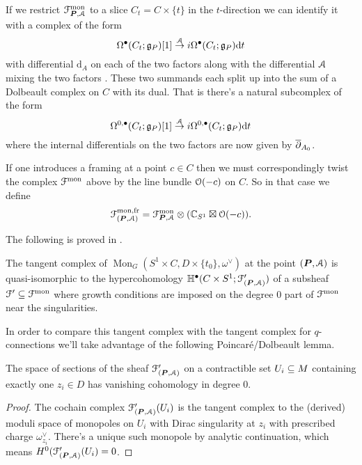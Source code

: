 \documentclass[10pt, oneside]{article}
\DeclareMathOperator{\mon}{Mon}
\renewcommand{\d}{\mathrm{d}}
\begin{document}
\begin{remark} \label{monopole_holo_restriction_rmk}
If we restrict $\mathcal{F}^{\mathrm{mon}}_{\boldsymbol{P}, \mathcal{A}}$ to a slice $C_t = C \times \{t\}$ in the $t$-direction we can identify it with a complex of the form
\[\Omega^\bullet(C_t; \gg_P)[1] \overset {\mc A} \to i \Omega^\bullet(C_t; \gg_P) \d t\]
with differential $\d_A$ on each of the two factors along with the differential $\mathcal{A}$ mixing the two factors .  These two summands each split up into the sum of a Dolbeault complex on $C$ with its dual.  That is there's a natural subcomplex of the form
\[\Omega^{0,\bullet}(C_t; \gg_P)[1] \overset {\mc A} \to i \Omega^{0,\bullet}(C_t; \gg_P) \d t\]
where the internal differentials on the two factors are now given by $\overline{\partial}_{A_0}$.
\end{remark}

\begin{remark}
If one introduces a framing at a point $c \in C$ then we must correspondingly twist the complex $\mathcal{F}^{\mathrm{mon}}$ above by the line bundle $\mathcal{O}(-c)$ on $C$.  So in that case we define 
\[\mathcal{F}^{\text{mon,fr}}_{(\boldsymbol{P},\mathcal{A})} = \mathcal{F}^{\mathrm{mon}}_{\boldsymbol{P}, \mathcal{A}} \otimes (\mathbb{C}_{S^1} \boxtimes \mathcal{O}(-c)).\]
\end{remark}

The following is proved in \cite{FoscoloDef}.
 
\begin{prop}
The tangent complex of $\mon_G(S^1 \times C, D \times \{t_0\}, \omega^\vee)$ at the point $(\boldsymbol{P},\mathcal{A})$ is quasi-isomorphic to the hypercohomology $\mathbb{H}^\bullet(C \times S^1; \mathcal{F}'_{(\boldsymbol{P},\mathcal{A})})$ of a subsheaf $\mathcal{F}' \subseteq \mathcal{F}^{\mathrm{mon}}$ where growth conditions are imposed on the degree 0 part of $\mathcal{F}^{\mathrm{mon}}$ near the singularities.
\end{prop}

In order to compare this tangent complex with the tangent complex for $q$-connections we'll take advantage of the following Poincar\'e/Dolbeault lemma.
\begin{lemma}
The space of sections of the sheaf $\mathcal{F}'_{(\boldsymbol{P},\mathcal{A})}$ on a contractible set $U_i \subseteq M$ containing exactly one $z_i \in D$ has vanishing cohomology in degree $0$.
\end{lemma}

\begin{proof}
The cochain complex $\mathcal{F}'_{(\boldsymbol{P},\mathcal{A})}(U_i)$ is the tangent complex to the (derived) moduli space of monopoles on $U_i$ with Dirac singularity at $z_i$ with prescribed charge $\omega^\vee_{z_i}$.  There's a unique such monopole by analytic continuation, which means $H^0(\mathcal{F}'_{(\boldsymbol{P},\mathcal{A})}(U_i)=0$.  
\end{proof}
\end{document}

